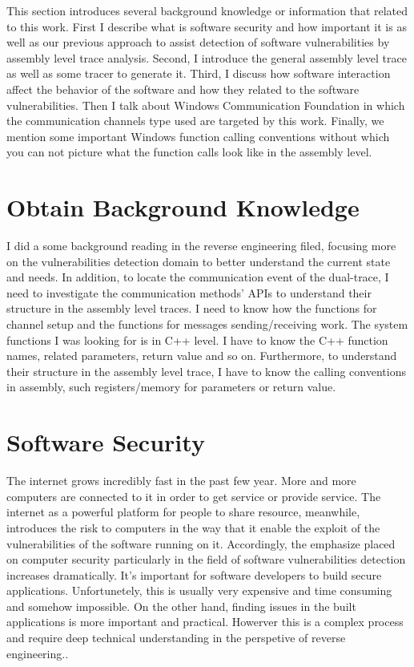 \label{chapter:Bac}
This section introduces several background knowledge or information that related to this work. First I describe what is software security and how important it is as well as our previous approach to assist detection of software vulnerabilities by assembly level trace analysis. Second, I introduce the general assembly level trace as well as some tracer to generate it. Third, I discuss how software interaction affect the behavior of the software and how they related to the software vulnerabilities. Then I talk about Windows Communication Foundation in which the communication channels type used are targeted by this work. Finally, we mention some important Windows function calling conventions without which you can not picture what the function calls look like in the assembly level.

\section{Obtain Background Knowledge}
I did a some background reading in the reverse engineering filed, focusing more on the vulnerabilities detection domain to better understand the current state and needs. In addition, to locate the communication event of the dual-trace, I need to investigate the communication methods' APIs to understand their structure in the assembly level traces. I need to know how the functions for channel setup and the functions for messages sending/receiving work. The system functions I was looking for is in C++ level. I have to know the C++ function names, related parameters, return value and so on. Furthermore, to understand their structure in the assembly level trace, I have to know the calling conventions in assembly, such registers/memory for parameters or return value.

\section{Software Security}
The internet grows incredibly fast in the past few year. More and more computers are connected to it in order to get service or provide service. The internet as a powerful platform for people to share resource, meanwhile, introduces the risk to computers in the way that it enable the exploit of the vulnerabilities of the software running on it. Accordingly, the emphasize placed on computer security particularly in the field of software vulnerabilities detection increases dramatically. It's important for software developers to build secure applications. Unfortunetely, this is usually very expensive and time consuming and somehow impossible. On the other hand, finding issues in the built applications is more important and practical. Howerver this is a complex process and require deep technical understanding in the perspetive of reverse engineering.\cite{dowd_art_2006}.


